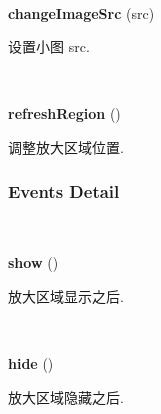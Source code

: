 \documentclass[letterpaper,10pt,english]{sphinxmanual}
\begin{document}

\begin{fulllineitems}
\label{api/component/imagezoom/index:ImageZoom.changeImageSrc}~
\begin{DUlineblock}{0em}
\item[] \textbf{changeImageSrc} (src)
\item[] 设置小图 src.
\end{DUlineblock}

\end{fulllineitems}



\begin{fulllineitems}
\label{api/component/imagezoom/index:ImageZoom.refreshRegion}~
\begin{DUlineblock}{0em}
\item[] \textbf{refreshRegion} ()
\item[] 调整放大区域位置.
\end{DUlineblock}

\end{fulllineitems}



\subsubsection{Events Detail}
\label{api/component/imagezoom/index:events-detail}

\begin{fulllineitems}
~
\begin{DUlineblock}{0em}
\item[] \textbf{show} ()
\item[] 放大区域显示之后.
\end{DUlineblock}

\end{fulllineitems}



\begin{fulllineitems}
~
\begin{DUlineblock}{0em}
\item[] \textbf{hide} ()
\item[] 放大区域隐藏之后.
\end{DUlineblock}

\end{fulllineitems}
\end{document}
